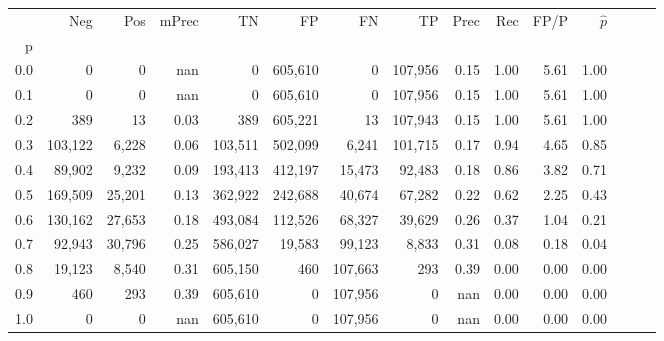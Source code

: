 \begin{tabular}{rrrrrrrrrrrrrrr}
\toprule
{} &      Neg &     Pos & mPrec &       TN &       FP &       FN &       TP &  Prec &   Rec &  FP/P & $\hat{p}$ \\
p   &          &         &       &          &          &          &          &       &       &       &           \\
\midrule
0.0 &        0 &       0 &   nan &        0 &  605,610 &        0 &  107,956 &  0.15 &  1.00 &  5.61 &      1.00 \\
0.1 &        0 &       0 &   nan &        0 &  605,610 &        0 &  107,956 &  0.15 &  1.00 &  5.61 &      1.00 \\
0.2 &      389 &      13 &  0.03 &      389 &  605,221 &       13 &  107,943 &  0.15 &  1.00 &  5.61 &      1.00 \\
0.3 &  103,122 &   6,228 &  0.06 &  103,511 &  502,099 &    6,241 &  101,715 &  0.17 &  0.94 &  4.65 &      0.85 \\
0.4 &   89,902 &   9,232 &  0.09 &  193,413 &  412,197 &   15,473 &   92,483 &  0.18 &  0.86 &  3.82 &      0.71 \\
0.5 &  169,509 &  25,201 &  0.13 &  362,922 &  242,688 &   40,674 &   67,282 &  0.22 &  0.62 &  2.25 &      0.43 \\
0.6 &  130,162 &  27,653 &  0.18 &  493,084 &  112,526 &   68,327 &   39,629 &  0.26 &  0.37 &  1.04 &      0.21 \\
0.7 &   92,943 &  30,796 &  0.25 &  586,027 &   19,583 &   99,123 &    8,833 &  0.31 &  0.08 &  0.18 &      0.04 \\
0.8 &   19,123 &   8,540 &  0.31 &  605,150 &      460 &  107,663 &      293 &  0.39 &  0.00 &  0.00 &      0.00 \\
0.9 &      460 &     293 &  0.39 &  605,610 &        0 &  107,956 &        0 &   nan &  0.00 &  0.00 &      0.00 \\
1.0 &        0 &       0 &   nan &  605,610 &        0 &  107,956 &        0 &   nan &  0.00 &  0.00 &      0.00 \\
\bottomrule
\end{tabular}
